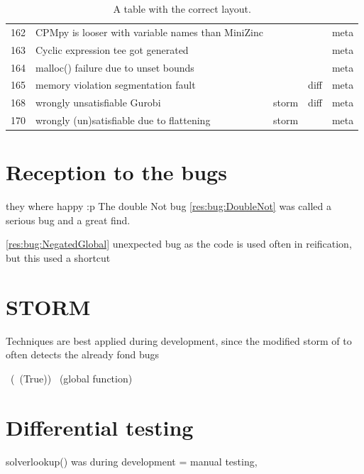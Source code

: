 \begin{table}[]
\begin{tabular}{lllll}
		162   & CPMpy is looser with variable names than MiniZinc         &                &              & meta         \\
		163   & Cyclic expression tee got generated                       &                &              & meta         \\
		164   & malloc() failure due to unset bounds                      &                &              & meta         \\
		165   & memory violation segmentation fault                       &                & diff         & meta         \\
		168   & wrongly unsatisfiable Gurobi                              & storm          & diff         & meta         \\
		170   & wrongly (un)satisfiable due to flattening                 & storm          &              & meta         \\ \bottomrule
	\end{tabular}
	\caption{A table with the correct layout.}
	\label{tab:bug:Technique}
\end{table}


\section{Reception to the bugs}
they where happy :p
The double Not bug \ref{res:bug:DoubleNot} was called a serious bug and a great find. %

\ref{res:bug:NegatedGlobal}
unexpected bug as the code is used often in reification, but this used a shortcut


\section{STORM}
Techniques are best applied during development, since the modified storm of to often detects the already fond bugs


~(~(True))
~(global function)
\section{Differential testing}
solverlookup()  was during development = manual testing, 

